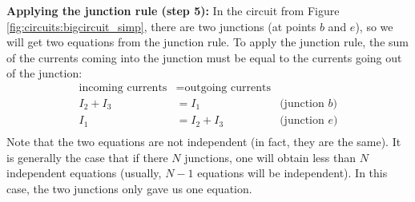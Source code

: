 \textbf{Applying the junction rule (step 5): }In the circuit from Figure \ref{fig:circuits:bigcircuit_simp}, there are two junctions (at points $b$ and $e$), so we will get two equations from the junction rule. To apply the junction rule, the sum of the currents coming into the junction must be equal to the currents going out of the junction:
\begin{align*}
\text{incoming currents}&=\text{outgoing currents}&\\
I_2+I_3 &= I_1 \quad &\text{(junction $b$)}\\
I_1 &= I_2+I_3 \quad &\text{(junction $e$)}\\
\end{align*}
Note that the two equations are not independent (in fact, they are the same). It is generally the case that if there $N$ junctions, one will obtain less than $N$ independent equations (usually, $N-1$ equations will be independent). In this case, the two junctions only gave us one equation. 

